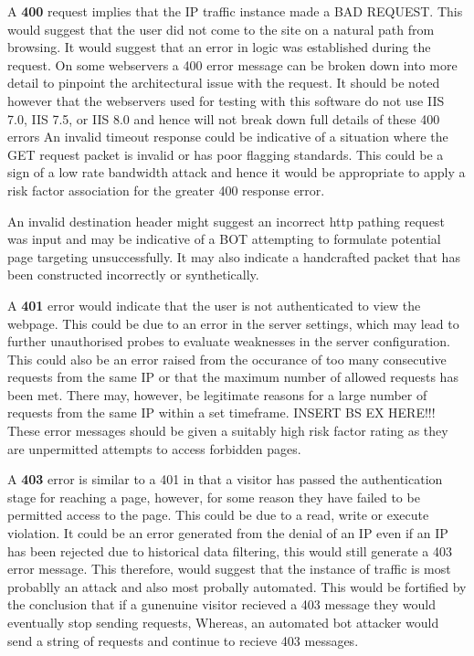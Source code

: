 A \textbf{400} request implies that the IP traffic instance made a BAD REQUEST. This would suggest that the user did not come to the site on a natural path from browsing. It would suggest that an error in logic was established during the request. 
On some webservers a 400 error message can be broken down into more detail to pinpoint the architectural issue with the request. It should be noted however that the webservers used for testing with this software do not use  IIS 7.0, IIS 7.5, or IIS 8.0 and hence will not break down full details of these 400 errors
An invalid timeout response could be indicative of a situation where the GET request packet is invalid or has poor flagging standards. This could be a sign of a low rate bandwidth attack and hence it would be appropriate to apply a risk factor association for the greater 400 response error. 

An invalid destination header might suggest an incorrect http pathing request was input and may be indicative of a BOT attempting to formulate potential page targeting unsuccessfully. It may also indicate a handcrafted packet that has been constructed incorrectly or synthetically.
 

A \textbf{401} error would indicate that the user is not authenticated to view the webpage. This could be due to an error in the server settings, which may lead to further unauthorised probes to evaluate weaknesses in the server configuration. This could also be an error raised from the occurance of too many consecutive requests from the same IP or that the maximum number of allowed requests has been met. There may, however, be legitimate reasons for a large number of requests from the same IP within a set timeframe. INSERT BS EX HERE!!! These error messages should be given a suitably high risk factor rating as they are unpermitted attempts to access forbidden pages.  


A \textbf{403} error is similar to a 401 in that a visitor has passed the authentication stage for reaching a page, however, for some reason they have failed to be permitted access to the page. This could be due to a read, write or execute violation. It could be an error generated from the denial of an IP even if an IP has been rejected due to historical data filtering, this would still generate a 403 error message. This therefore, would suggest that the instance of traffic is most probablly an attack and also most probally automated. This would be fortified by the conclusion that if a gunenuine visitor recieved a 403 message they would eventually stop sending requests, Whereas, an automated bot attacker would send a string of requests and continue to recieve 403 messages.

